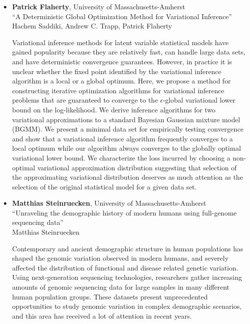 \begin{itemize}
\item \textbf{Patrick Flaherty}, University of Massachusetts-Amherst \\
``A Deterministic Global Optimization Method for Variational Inference'' \\
Hachem Saddiki, Andrew C. Trapp, Patrick Flaherty


Variational inference methods for latent variable statistical models have gained popularity because they are relatively fast, can handle large data sets, and have deterministic convergence guarantees.
However, in practice it is unclear whether the fixed point identified by the variational inference algorithm is a local or a global optimum.
Here, we propose a method for constructing iterative optimization algorithms for variational inference problems that are guaranteed to converge to the $\epsilon$-global variational lower bound on the log-likelihood.
We derive inference algorithms for two variational approximations to a standard Bayesian Gaussian mixture model (BGMM).
We present a minimal data set for empirically testing convergence and show that a variational inference algorithm frequently converges to a local optimum while our algorithm always converges to the globally optimal variational lower bound.
We characterize the loss incurred by choosing a non-optimal variational approximation distribution suggesting that selection of the approximating variational distribution deserves as much attention as the selection of the original statistical model for a given data set.

\item \textbf{Matthias Steinruecken}, University of Massachusetts-Amherst \\
``Unraveling the demographic history of modern humans using full-genome sequencing data'' \\
Matthias Steinruecken


Contemporary and ancient demographic structure in human populations has shaped the genomic variation observed in modern humans, and severely affected the distribution of functional and disease related genetic variation. Using next-generation sequencing technologies, researchers gather increasing amounts of genomic sequencing data for large samples in many different human population groups. These datasets present unprecedented opportunities to study genomic variation in complex demographic scenarios, and this area has received a lot of attention in recent years.



\end{itemize}

